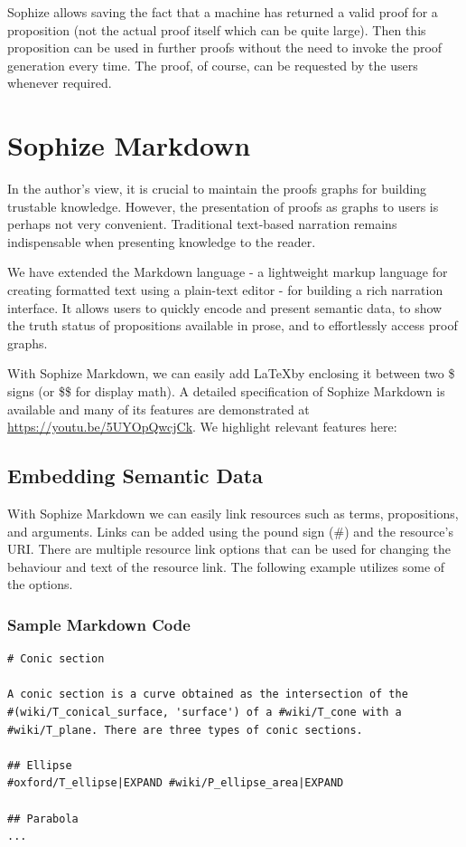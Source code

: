 \documentclass[runningheads]{llncs}
\begin{document}
Sophize allows saving the fact that a machine has returned a valid proof for a proposition (not the actual proof itself which can be quite large). Then this proposition can be used in further proofs without the need to invoke the proof generation every time. The proof, of course, can be requested by the users whenever required.


\section{Sophize Markdown}

In the author's view, it is crucial to maintain the proofs graphs for building trustable knowledge. However, the presentation of proofs as graphs to users is perhaps not very convenient. Traditional text-based narration remains indispensable when presenting knowledge to the reader.

We have extended the Markdown language - a lightweight markup language for creating formatted text using a plain-text editor - for building a rich narration interface. It allows users to quickly encode and present semantic data, to show the truth status of propositions available in prose, and to effortlessly access proof graphs. 

With Sophize Markdown, we can easily add \LaTeX\space by enclosing it between two \$ signs (or \$\$ for display math). A detailed specification of Sophize Markdown is available \cite{EasyChair6207} and many of its features are demonstrated at \url{https://youtu.be/5UYOpQwcjCk}. We highlight relevant features here:

\subsection{Embedding Semantic Data}

With Sophize Markdown we can easily link resources such as terms, propositions, and arguments. Links can be added using the pound sign (\#) and the resource's URI. There are multiple resource link options that can be used for changing the behaviour and text of the resource link. The following example utilizes some of the options.

\subsubsection*{Sample Markdown Code}

\begin{verbatim}
# Conic section

A conic section is a curve obtained as the intersection of the 
#(wiki/T_conical_surface, 'surface') of a #wiki/T_cone with a 
#wiki/T_plane. There are three types of conic sections.

## Ellipse
#oxford/T_ellipse|EXPAND #wiki/P_ellipse_area|EXPAND

## Parabola
...
\end{verbatim}
\end{document}
